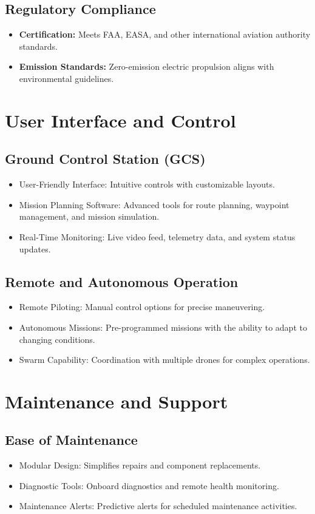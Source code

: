 \documentclass{article}
\begin{document}
\subsection{Regulatory Compliance}
\begin{itemize}
    \item \textbf{Certiﬁcation:} Meets FAA, EASA, and other international aviation authority standards.
    \item \textbf{Emission Standards:} Zero-emission electric propulsion aligns with environmental guidelines.
\end{itemize}

\section{User Interface and Control}
\subsection{Ground Control Station (GCS)}
\begin{itemize}
    \item User-Friendly Interface: Intuitive controls with customizable layouts.
    \item Mission Planning Software: Advanced tools for route planning, waypoint management, and mission simulation.
    \item Real-Time Monitoring: Live video feed, telemetry data, and system status updates.
\end{itemize}

\subsection{Remote and Autonomous Operation}
\begin{itemize}
    \item Remote Piloting: Manual control options for precise maneuvering.
    \item Autonomous Missions: Pre-programmed missions with the ability to adapt to changing conditions.
    \item Swarm Capability: Coordination with multiple drones for complex operations.
\end{itemize}

\section{Maintenance and Support}
\subsection{Ease of Maintenance}
\begin{itemize}
    \item Modular Design: Simpliﬁes repairs and component replacements.
    \item Diagnostic Tools: Onboard diagnostics and remote health monitoring.
    \item Maintenance Alerts: Predictive alerts for scheduled maintenance activities.
\end{itemize}
\end{document}
